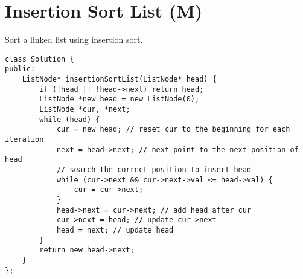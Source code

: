 \section{Insertion Sort List (M)}
Sort a linked list using insertion sort.\\

\begin{lstlisting}
class Solution {
public:
    ListNode* insertionSortList(ListNode* head) {
        if (!head || !head->next) return head;
        ListNode *new_head = new ListNode(0);
        ListNode *cur, *next;
        while (head) {
            cur = new_head; // reset cur to the beginning for each iteration
            next = head->next; // next point to the next position of head
            // search the correct position to insert head
            while (cur->next && cur->next->val <= head->val) {
                cur = cur->next;
            }
            head->next = cur->next; // add head after cur
            cur->next = head; // update cur->next
            head = next; // update head
        }
        return new_head->next;
    }
};
\end{lstlisting}





